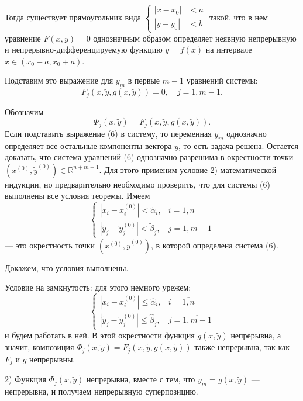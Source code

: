 \documentclass{article}
\begin{document}
Тогда существует прямоугольник вида $\left\{
\begin{aligned}
|x - x_0| &< a \\
|y - y_0| &< b
\end{aligned}
\right.$ такой, что в нем уравнение $F(x, y) = 0$ однозначным образом определяет неявную непрерывную и непрерывно-дифференцируемую функцию $y = f(x)$ на интервале $x \in (x_0 - a, x_0 + a)$.


\newpage
Подставим это выражение для $y_m$ в первые $m-1$ уравнений системы:
\[
F_j(x, \widetilde{y}, g(x, \widetilde{y})) = 0, \quad j = \overline{1, m-1}.
\]

Обозначим
\begin{equation}
\Phi_j(x, \widetilde{y}) = F_j(x, \widetilde{y}, g(x, \widetilde{y})) \tag{6}.
\end{equation}
Если подставить выражение (6) в систему, то переменная $y_m$ однозначно определяет все остальные компоненты вектора $y$, то есть задача решена. Остается доказать, что система уравнений (6) однозначно разрешима в окрестности точки $(x^{(0)}, \widetilde{y}^{(0)}) \in \mathbb{R}^{n+m-1}$. Для этого применим условие 2) математической индукции, но предварительно необходимо проверить, что для системы (6) выполнены все условия теоремы.
Имеем
\[
\begin{cases}
|x_i - x_i^{(0)}| < \widetilde{\alpha}_i, & i = \overline{1,n} \\
|\widetilde{y}_j - \widetilde{y}_j^{(0)}| < \widetilde{\beta}_j, & j = \overline{1,m-1}
\end{cases}
\]
— это окрестность точки $(x^{(0)}, \widetilde{y}^{(0)})$, в которой определена система (6).

Докажем, что условия выполнены.

Условие на замкнутость: для этого немного урежем:
\[
\begin{cases}
|x_i - x_i^{(0)}| \leq \widehat{\alpha}_i, & i = \overline{1,n} \\
|\widetilde{y}_j - \widetilde{y}_j^{(0)}| \leq \widehat{\beta}_j, & j = \overline{1,m-1}
\end{cases}
\]
и будем работать в ней. В этой окрестности функция $g(x, \widetilde{y})$ непрерывна, а значит, композиция $\Phi_j(x, \widetilde{y}) = F_j(x, \widetilde{y}, g(x, \widetilde{y}))$ также непрерывна, так как $F_j$ и $g$ непрерывны.

2) Функция $\Phi_j(x, \widetilde{y})$ непрерывна, вместе с тем, что $y_m = g(x, \widetilde{y})$ — непрерывна, и получаем непрерывную суперпозицию.
\end{document}
